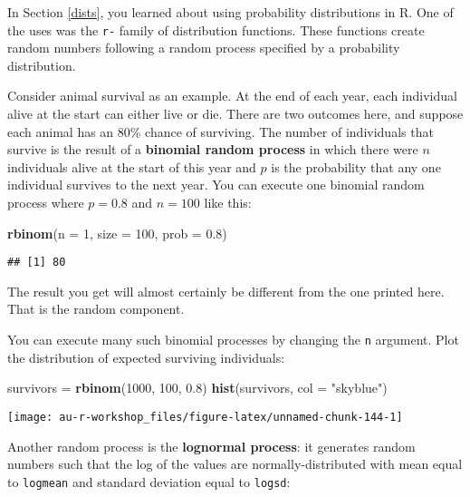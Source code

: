 \documentclass[]{book}
\newenvironment{Shaded}{\begin{snugshade}}{\end{snugshade}}
\newcommand{\KeywordTok}[1]{\textcolor[rgb]{0.13,0.29,0.53}{\textbf{#1}}}
\newcommand{\DataTypeTok}[1]{\textcolor[rgb]{0.13,0.29,0.53}{#1}}
\newcommand{\DecValTok}[1]{\textcolor[rgb]{0.00,0.00,0.81}{#1}}
\newcommand{\FloatTok}[1]{\textcolor[rgb]{0.00,0.00,0.81}{#1}}
\newcommand{\StringTok}[1]{\textcolor[rgb]{0.31,0.60,0.02}{#1}}
\newcommand{\NormalTok}[1]{#1}
\theoremstyle{definition}
\theoremstyle{definition}
\theoremstyle{definition}
\theoremstyle{remark}
\begin{document}
In Section \ref{dists}, you learned about using probability
distributions in R. One of the uses was the \texttt{r-} family of
distribution functions. These functions create random numbers following
a random process specified by a probability distribution.

Consider animal survival as an example. At the end of each year, each
individual alive at the start can either live or die. There are two
outcomes here, and suppose each animal has an 80\% chance of surviving.
The number of individuals that survive is the result of a
\textbf{binomial random process} in which there were \(n\) individuals
alive at the start of this year and \(p\) is the probability that any
one individual survives to the next year. You can execute one binomial
random process where \(p = 0.8\) and \(n = 100\) like this:

\begin{Shaded}
\begin{Highlighting}[]
\KeywordTok{rbinom}\NormalTok{(}\DataTypeTok{n =} \DecValTok{1}\NormalTok{, }\DataTypeTok{size =} \DecValTok{100}\NormalTok{, }\DataTypeTok{prob =} \FloatTok{0.8}\NormalTok{)}
\end{Highlighting}
\end{Shaded}

\begin{verbatim}
## [1] 80
\end{verbatim}

The result you get will almost certainly be different from the one
printed here. That is the random component.

You can execute many such binomial processes by changing the \texttt{n}
argument. Plot the distribution of expected surviving individuals:

\begin{Shaded}
\begin{Highlighting}[]
\NormalTok{survivors =}\StringTok{ }\KeywordTok{rbinom}\NormalTok{(}\DecValTok{1000}\NormalTok{, }\DecValTok{100}\NormalTok{, }\FloatTok{0.8}\NormalTok{)}
\KeywordTok{hist}\NormalTok{(survivors, }\DataTypeTok{col =} \StringTok{"skyblue"}\NormalTok{)}
\end{Highlighting}
\end{Shaded}

\begin{center}\texttt{[image: au-r-workshop\_files/figure-latex/unnamed-chunk-144-1]} \end{center}

Another random process is the \textbf{lognormal process}: it generates
random numbers such that the log of the values are normally-distributed
with mean equal to \texttt{logmean} and standard deviation equal to
\texttt{logsd}:
\end{document}
